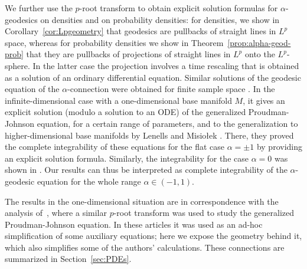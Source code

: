\documentclass[11pt]{amsart}
\theoremstyle{definition}
\begin{document}
We further use the $p$-root transform to obtain explicit solution formulas for $\alpha$-geodesics on densities and on probability densities:
for densities, we show in Corollary~\ref{cor:Lpgeometry} that geodesics are pullbacks of straight lines in $L^p$ space, whereas for probability densities we show in Theorem~\ref{prop:alpha-geod-prob} that they are pullbacks of projections of straight lines in $L^p$ onto the $L^p$-sphere. 
In the latter case the projection involves a time rescaling that is obtained as a solution of an ordinary differential equation.
Similar solutions of the geodesic equation of the $\alpha$-connection were obtained for finite sample space \cite[pp.~50-51]{ay2017information}.
In the infinite-dimensional case with a one-dimensional base manifold $M$, it gives an explicit solution (modulo a solution to an ODE) of the  generalized Proudman-Johnson equation, for a certain range of parameters, and to the generalization to higher-dimensional base manifolds by Lenells and Misio\l{}ek \cite{lenells2014amari}.
There, they proved the complete integrability of these equations for the flat case $\alpha = \pm 1$ by providing an explicit solution formula.
Similarly, the integrability for the case $\alpha = 0$ was shown in \cite{khesin2013geometry}.
Our results can thus be interpreted as complete integrability of the $\alpha$-geodesic equation for the whole range $\alpha \in (-1,1)$.

The results in the one-dimensional situation are in correspondence with the analysis of~\cite{kogelbauer2020global,sarria2013blow}, where a similar $p$-root transform was  used to study the generalized Proudman-Johnson equation. In these articles it was used as an ad-hoc simplification of some auxiliary equations; here we expose the geometry behind it, which also simplifies some of the authors' calculations. 
These connections are summarized in Section~\ref{sec:PDEs}.

\end{document}
